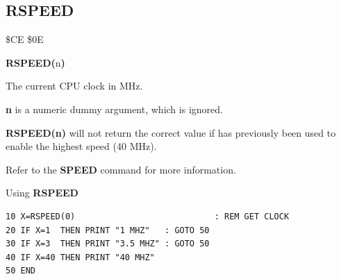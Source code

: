 \subsection{RSPEED}
\begin{description}[leftmargin=2cm,style=nextline]
\item [Token:]    \$CE \$0E

\item [Format:]   {\bf RSPEED(}n{\bf)}

\item [Returns:]  The current CPU clock in MHz.

                  {\bf n} is a numeric dummy argument, which is ignored.

\item [Remarks:]  {\bf RSPEED(n)} will not return the correct value if  has previously been used to enable the highest speed (40 MHz).

                  Refer to the {\bf SPEED} command for more information.

\item [Example:]  Using {\bf RSPEED}

\begin{tcolorbox}[colback=black,coltext=white]
\verbatimfont{\codefont}
\begin{verbatim}
10 X=RSPEED(0)                            : REM GET CLOCK
20 IF X=1  THEN PRINT "1 MHZ"   : GOTO 50
30 IF X=3  THEN PRINT "3.5 MHZ" : GOTO 50
40 IF X=40 THEN PRINT "40 MHZ"
50 END
\end{verbatim}
\end{tcolorbox}
\end{description}


\newpage

